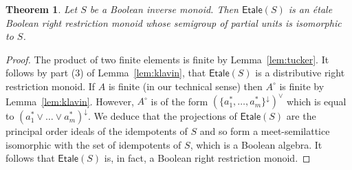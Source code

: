 \documentclass[a4paper]{amsart}
\newtheorem{theorem}{Theorem}[section]
\begin{document}
\begin{theorem}\label{them:etale-main}  Let $S$ be a Boolean inverse monoid.
Then $\mathsf{Etale}(S)$ is an \'etale Boolean right restriction monoid
whose semigroup of partial units is isomorphic to $S$.
\end{theorem}
\begin{proof} The product of two finite elements is finite by Lemma~\ref{lem:tucker}.
It follows by part (3) of Lemma~\ref{lem:klavin}, that $\mathsf{Etale}(S)$
is a distributive right restriction monoid. 
If $A$ is finite (in our technical sense) then $A^{\circ}$ is finite by Lemma~\ref{lem:klavin}.
However, $A^{\circ}$ is of the form $(\{a_{1}^{\ast},\ldots,  a_{m}^{\ast}\}^{\downarrow})^{\vee}$
which is equal to $(a_{1}^{\ast} \vee \ldots  \vee a_{m}^{\ast})^{\downarrow}$.
We deduce that the projections of $\mathsf{Etale}(S)$ are the principal order ideals of the idempotents of $S$
and so form a meet-semilattice isomorphic with the set of idempotents of $S$, which is a Boolean algebra.
It follows that $\mathsf{Etale}(S)$ is, in fact, a Boolean right restriction monoid.


\end{proof}
\end{document}
